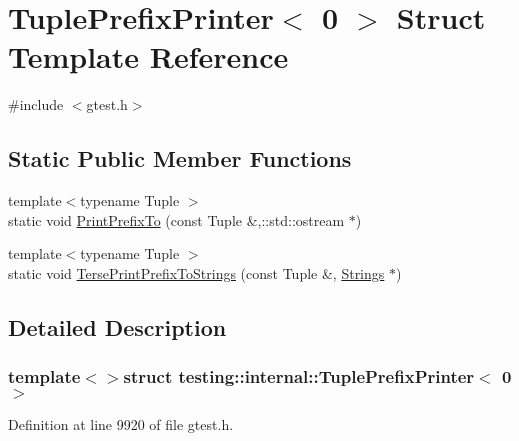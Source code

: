 \hypertarget{structtesting_1_1internal_1_1TuplePrefixPrinter_3_010_01_4}{\section{\-Tuple\-Prefix\-Printer$<$ 0 $>$ \-Struct \-Template \-Reference}
\label{d3/dba/structtesting_1_1internal_1_1TuplePrefixPrinter_3_010_01_4}
}


{\ttfamily \#include $<$gtest.\-h$>$}

\subsection*{\-Static \-Public \-Member \-Functions}
\begin{DoxyCompactItemize}
\item 
{\footnotesize template$<$typename Tuple $>$ }\\static void \hyperlink{structtesting_1_1internal_1_1TuplePrefixPrinter_3_010_01_4_a081443fe9a11dd0a09286c4975274c8a}{\-Print\-Prefix\-To} (const \-Tuple \&,\-::std\-::ostream $\ast$)
\item 
{\footnotesize template$<$typename Tuple $>$ }\\static void \hyperlink{structtesting_1_1internal_1_1TuplePrefixPrinter_3_010_01_4_a4d6a4b05a07e62fcb28d7884f92d6a82}{\-Terse\-Print\-Prefix\-To\-Strings} (const \-Tuple \&, \hyperlink{namespacetesting_1_1internal_a6d618e88721d4c38cbecabe0d2e8341c}{\-Strings} $\ast$)
\end{DoxyCompactItemize}


\subsection{\-Detailed \-Description}
\subsubsection*{template$<$$>$struct testing\-::internal\-::\-Tuple\-Prefix\-Printer$<$ 0 $>$}



\-Definition at line 9920 of file gtest.\-h.



